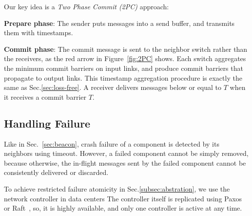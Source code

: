Our key idea  is a \emph{Two Phase Commit (2PC)} approach: %

\begin{ecompact}
\item \textbf{Prepare phase}: The sender puts messages into a send buffer, and transmits them with timestamps. 
\item \textbf{Commit phase}:  The commit message is sent to the neighbor switch rather than the receivers, as the red arrow in Figure~\ref{fig:2PC} shows. Each switch aggregates the minimum commit barriers on input links, and produce commit barriers that propagate to output links. This timestamp aggregation procedure is exactly the same as Sec.\ref{sec:loss-free}. A receiver delivers messages below or equal to $T$  when it receives a commit barrier $T$. 
\end{ecompact}

\subsection{Handling Failure}

Like in Sec.~\ref{sec:beacon}, crash failure of a component is detected by its neighbors using timeout.
However, a failed component cannot be simply removed, because otherwise, the in-flight messages sent by the failed component cannot be consistently delivered or discarded.

To achieve restricted failure atomicity in Sec.\ref{subsec:abstration}, we use the network controller in data centers 
The controller itself is replicated using Paxos~\cite{lamport1998part} or Raft~\cite{raft}, so, it is highly available, and only one controller is active at any time.

